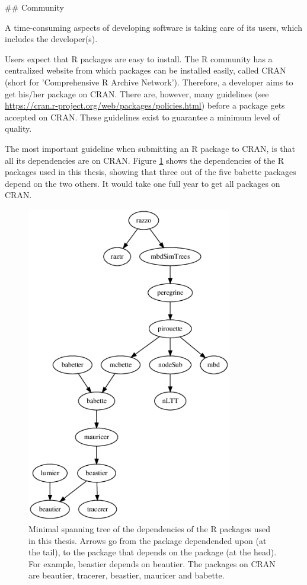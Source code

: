 ## Community

A time-consuming aspects of developing software is taking care of its
users, which includes the developer(s).

Users expect that R packages are easy to install.
The R community has a centralized website from which packages
can be installed easily, called CRAN (short for 'Comprehensive R Archive 
Network').
Therefore, a developer aims to get his/her package on CRAN.
There are, however, many 
guidelines (see \url{https://cran.r-project.org/web/packages/policies.html}) before 
a package gets accepted on CRAN.
These guidelines exist to guarantee a minimum level of quality.

The most important guideline when submitting an R package to CRAN,
is that all its dependencies are on CRAN. Figure \ref{fig:dependencies}
shows the dependencies of the R packages used in this thesis, showing that
three out of the five babette packages depend on the two others. 
It would take one full year to get all packages on CRAN.

\begin{figure}[H]
  \includegraphics[width=0.8\textwidth]{dependencies.png}
  \caption{
    Minimal spanning tree of the dependencies of the R packages used in this
    thesis. Arrows go from the package dependended upon (at the tail), 
    to the package that depends on the package (at the head). For example,
    beastier depends on beautier. The packages on CRAN are beautier,
    tracerer, beastier, mauricer and babette.
  }
  \label{fig:dependencies}
\end{figure}

